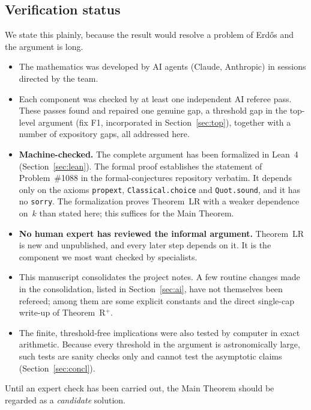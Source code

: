 \subsection{Verification status}
We state this plainly, because the result would resolve a problem of Erd\H{o}s and the argument is long.
\begin{itemize}[leftmargin=2em]
\item The mathematics was developed by AI agents (Claude, Anthropic) in sessions directed by the team.
\item Each component was checked by at least one independent AI referee pass. These passes found and repaired
  one genuine gap, a threshold gap in the top-level argument (fix F1, incorporated in
  Section~\ref{sec:top}), together with a number of expository gaps, all addressed here.
\item \textbf{Machine-checked.} The complete argument has been formalized in Lean~4 (Section~\ref{sec:lean}).
  The formal proof establishes the statement of Problem~\#1088 in the formal-conjectures repository verbatim. It
  depends only on the axioms \texttt{propext}, \texttt{Classical.choice} and \texttt{Quot.sound}, and it has no
  \texttt{sorry}. The formalization proves Theorem~LR with a weaker dependence on~$k$ than stated here; this suffices
  for the Main Theorem.
\item \textbf{No human expert has reviewed the informal argument.} Theorem~LR is new and unpublished, and every later
  step depends on it. It is the component we most want checked by specialists.
\item This manuscript consolidates the project notes. A few routine changes made in the consolidation, listed in
  Section~\ref{sec:ai}, have not themselves been refereed; among them are some explicit constants and the direct
  single-cap write-up of Theorem~R$^+$.
\item The finite, threshold-free implications were also tested by computer in exact arithmetic. Because every
  threshold in the argument is astronomically large, such tests are sanity checks only and cannot test the
  asymptotic claims (Section~\ref{sec:concl}).
\end{itemize}
Until an expert check has been carried out, the Main Theorem should be regarded as a \emph{candidate} solution.

